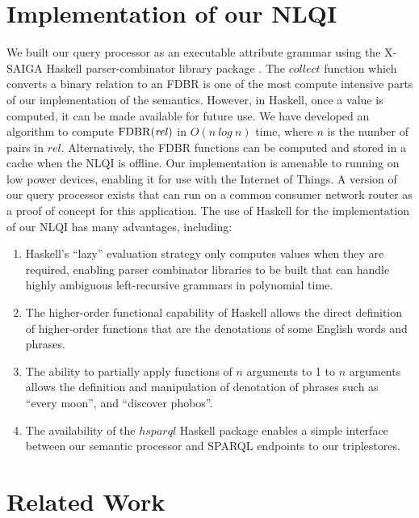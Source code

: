 \documentclass[../main.tex]{subfiles}
\begin{document}
\begin{refsection}
\section{Implementation of our NLQI}
\label{webist2019conf:implementation}
We built our query processor as an executable attribute grammar using the X-SAIGA Haskell parser-combinator library package \cite{frosthafiz2008}.
The $\mathit{collect}$ function which converts a binary relation to an FDBR is one of the most
compute intensive parts of our implementation of the semantics. However, in Haskell, once a value is
computed, it can be made available for future use. We have developed an algorithm to compute
$\mathrm{FDBR}({\mathit{rel}})$ in $O(n\ log\ n)$ time, where $n$ is the number of pairs in $\mathit{rel}$.
Alternatively, the FDBR functions can be computed and stored in a cache when the NLQI is offline.
Our implementation is amenable to running on low power devices, enabling it for use with the Internet of Things. A version of our query processor exists that can run on a common consumer network router as a proof of concept for this application.
The use of Haskell for the implementation of our NLQI has many advantages, including:

\begin{enumerate}
	\item Haskell's ``lazy'' evaluation strategy only computes values when they are required, enabling parser combinator
	libraries to be built that can handle highly ambiguous left-recursive grammars in polynomial time.
	\item The higher-order functional capability of Haskell allows the direct definition of higher-order
	functions that are the denotations of some English words and phrases.
	\item The ability to partially apply functions of $n$ arguments to 1 to $n$ arguments allows the
	definition and manipulation of denotation of phrases such as ``every moon'', and ``discover
	phobos''.
	\item The availability of the $\mathit{hsparql}$ \cite{hsparql} Haskell package enables a simple interface between our semantic processor and SPARQL endpoints to our triplestores.
\end{enumerate}

\section{Related Work}
\label{webist2019conf:relatedwork}


\end{refsection}
\end{document}

